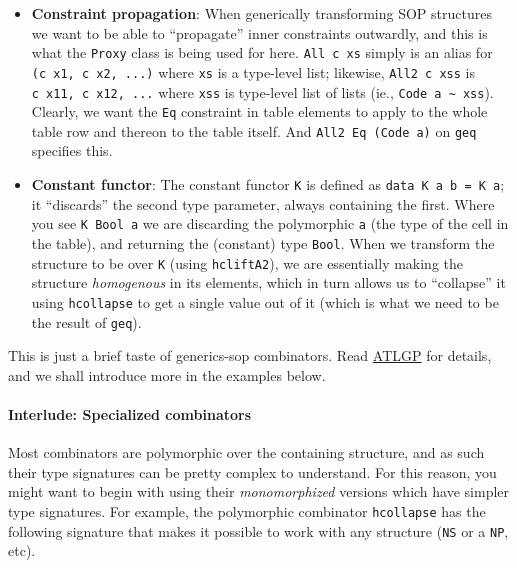 \begin{itemize}
\tightlist
\item
  \textbf{Constraint propagation}: When generically transforming SOP
  structures we want to be able to ``propagate'' inner constraints
  outwardly, and this is what the \texttt{Proxy} class is being used for
  here. \texttt{All\ c\ xs} simply is an alias for
  \texttt{(c\ x1,\ c\ x2,\ ...)} where \texttt{xs} is a type-level list;
  likewise, \texttt{All2\ c\ xss} is \texttt{c\ x11,\ c\ x12,\ ...}
  where \texttt{xss} is type-level list of lists (ie.,
  \texttt{Code\ a\ \textasciitilde{}\ xss}). Clearly, we want the
  \texttt{Eq} constraint in table elements to apply to the whole table
  row and thereon to the table itself. And \texttt{All2\ Eq\ (Code\ a)}
  on \texttt{geq\textquotesingle{}} specifies this.
\item
  \textbf{Constant functor}: The constant functor \texttt{K} is defined
  as \texttt{data\ K\ a\ b\ =\ K\ a}; it ``discards'' the second type
  parameter, always containing the first. Where you see
  \texttt{K\ Bool\ a} we are discarding the polymorphic \texttt{a} (the
  type of the cell in the table), and returning the (constant) type
  \texttt{Bool}. When we transform the structure to be over \texttt{K}
  (using \texttt{hcliftA2}), we are essentially making the structure
  \emph{homogenous} in its elements, which in turn allows us to
  ``collapse'' it using \texttt{hcollapse} to get a single value out of
  it (which is what we need to be the result of \texttt{geq}).
\end{itemize}

This is just a brief taste of generics-sop combinators. Read
\href{https://github.com/kosmikus/SSGEP/blob/master/LectureNotes.pdf}{ATLGP}
for details, and we shall introduce more in the examples below.

\hypertarget{interlude-specialized-combinators}{%
\paragraph{Interlude: Specialized
combinators}\label{interlude-specialized-combinators}}

Most combinators are polymorphic over the containing structure, and as
such their type signatures can be pretty complex to understand. For this
reason, you might want to begin with using their \emph{monomorphized}
versions which have simpler type signatures. For example, the
polymorphic combinator \texttt{hcollapse} has the following signature
that makes it possible to work with any structure (\texttt{NS} or a
\texttt{NP}, etc).


